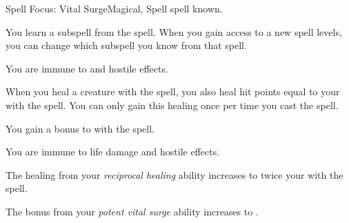     \begin{feat}{Spell Focus: Vital Surge}{Magical, Spell}
        \featpre {} spell known.

         You learn a subspell from the  spell.
        When you gain access to a new spell levels, you can change which subspell you know from that spell.

         You are immune to  and hostile  effects.

         When you heal a creature with the  spell, you also heal hit points equal to your  with the spell.
        You can only gain this healing once per time you cast the spell.

         You gain a  bonus to  with the  spell.

         You are immune to life damage and hostile  effects.

         The healing from your \textit{reciprocal healing} ability increases to twice your  with the spell.

         The bonus from your \textit{potent vital surge} ability increases to .
    \end{feat}

